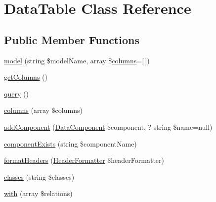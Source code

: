 \hypertarget{classhamburgscleanest_1_1_data_tables_1_1_models_1_1_data_table}{}\section{Data\+Table Class Reference}
\label{classhamburgscleanest_1_1_data_tables_1_1_models_1_1_data_table}
\subsection*{Public Member Functions}
\begin{DoxyCompactItemize}
\item 
\hyperlink{classhamburgscleanest_1_1_data_tables_1_1_models_1_1_data_table_aed2405fdf602895cf021ddf2de67f37c}{model} (string \$model\+Name, array \$\hyperlink{classhamburgscleanest_1_1_data_tables_1_1_models_1_1_data_table_aa58d366fa31ae19686c78817af00407c}{columns}=\mbox{[}$\,$\mbox{]})
\item 
\hyperlink{classhamburgscleanest_1_1_data_tables_1_1_models_1_1_data_table_a6287262cb9628d7a89d8fc16dcb51177}{get\+Columns} ()
\item 
\hyperlink{classhamburgscleanest_1_1_data_tables_1_1_models_1_1_data_table_a8dbd35d765e8ff0d1c34461ef67c5abf}{query} ()
\item 
\hyperlink{classhamburgscleanest_1_1_data_tables_1_1_models_1_1_data_table_aa58d366fa31ae19686c78817af00407c}{columns} (array \$columns)
\item 
\hyperlink{classhamburgscleanest_1_1_data_tables_1_1_models_1_1_data_table_a267226c73f5cd89ec9f01776aab256c5}{add\+Component} (\hyperlink{classhamburgscleanest_1_1_data_tables_1_1_models_1_1_data_component}{Data\+Component} \$component, ? string \$name=null)
\item 
\hyperlink{classhamburgscleanest_1_1_data_tables_1_1_models_1_1_data_table_a7b7268aff8cff85372212b29c5cdf7c5}{component\+Exists} (string \$component\+Name)
\item 
\hyperlink{classhamburgscleanest_1_1_data_tables_1_1_models_1_1_data_table_ab215f578c0cd2a411123b4878fa8fa55}{format\+Headers} (\hyperlink{interfacehamburgscleanest_1_1_data_tables_1_1_interfaces_1_1_header_formatter}{Header\+Formatter} \$header\+Formatter)
\item 
\hyperlink{classhamburgscleanest_1_1_data_tables_1_1_models_1_1_data_table_a813e5943086af6dacdea0ffc17b284d6}{classes} (string \$classes)
\item 
\hyperlink{classhamburgscleanest_1_1_data_tables_1_1_models_1_1_data_table_a27b8523da3acb9865571844d5487f6a0}{with} (array \$relations)

\end{DoxyCompactItemize}
